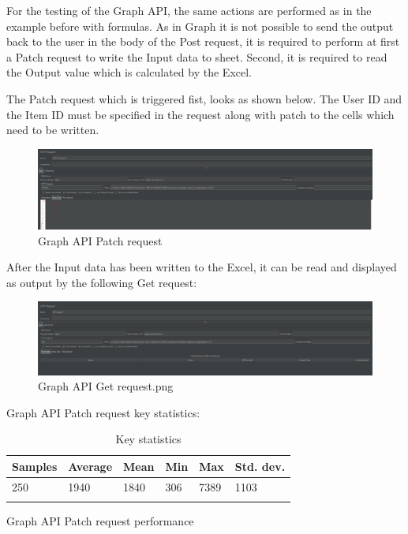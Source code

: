 For the testing of the Graph API, the same actions are performed as in the example before with formulas. As in Graph it is not possible to send the output back to the user in the body of the Post request, it is required to perform at first a Patch request to write the Input data to sheet. Second, it is required to read the Output value which is calculated by the Excel. 

The Patch request which is triggered fist, looks as shown below. The User ID and the Item ID must be specified in the request along with patch to the cells which need to be written. 

\begin{figure}[h!]
  \includegraphics[scale=0.5]{Report/Figures/Graph API Patch request.png}
  \caption{Graph API Patch request}
  \label{fig: Graph API Patch request}
\end{figure}

After the Input data has been written to the Excel, it can be read and displayed as output by the following Get request:

\begin{figure}[h!]
  \includegraphics[scale=0.5]{Report/Figures/Graph API Get request.png}
  \caption{Graph API Get request.png}
  \label{fig: Graph API Get request.png}
\end{figure}

Graph API Patch request key statistics:

\begin{longtable}[]{@{}llllll@{}}
\toprule
Samples & Average & Mean & Min & Max & Std. dev.\tabularnewline
\midrule
\endhead
250 & 1940 & 1840 & 306 & 7389 & 1103\tabularnewline
\bottomrule
\caption{Key statistics}
\label{Required API permissions}
\end{longtable}

Graph API Patch request performance

